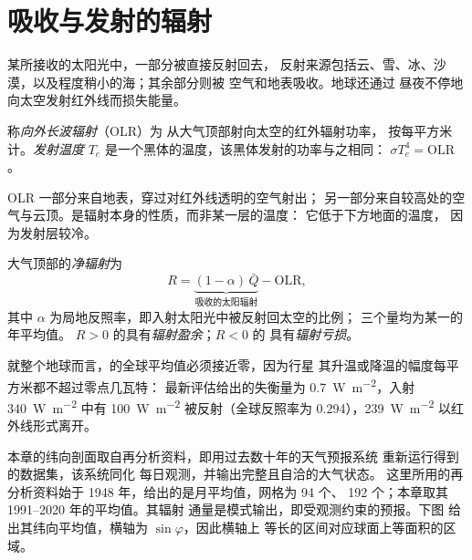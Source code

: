 \section{吸收与发射的辐射}\label{sec:b1:radiation-heat-transport:toa}

某所接收的太阳光中，一部分被直接反射回去，
反射来源包括云、雪、冰、沙漠，以及程度稍小的海；其余部分则被
空气和地表吸收。地球还通过
昼夜不停地向太空发射红外线而损失能量。

\begin{definition}[向外长波辐射]\label{def:b1:radiation-heat-transport:olr}
称\emph{向外长波辐射}（OLR）为
从大气顶部射向太空的红外辐射功率，
按每平方米计。\emph{发射温度}
$T_e$ 是一个黑体的温度，该黑体发射的功率与之相同：
$\sigma T_e^4 = \text{OLR}$。
\end{definition}

OLR 一部分来自地表，穿过对红外线透明的空气射出；
另一部分来自较高处的空气与云顶。是辐射本身的性质，而非某一层的温度：
它低于下方地面的温度，
因为发射层较冷。

\begin{definition}\label{def:b1:radiation-heat-transport:net-radiation}
大气顶部的\emph{净辐射}为
\[
  R = \underbrace{(1 - \alpha)\,\bar Q}_{\text{吸收的太阳辐射}} - \text{OLR},
\]
其中 $\alpha$ 为局地反照率，即入射太阳光中被反射回太空的比例；
三个量均为某一的年平均值。
$R > 0$ 的具有\emph{辐射盈余}；$R < 0$ 的
具有\emph{辐射亏损}。
\end{definition}

就整个地球而言，的全球平均值必须接近零，因为行星
其升温或降温的幅度每平方米都不超过零点几瓦特：
最新评估给出的失衡量为 \qty{0.7}{W.m^{-2}}，入射
\qty{340}{W.m^{-2}} 中有 \qty{100}{W.m^{-2}} 被反射（全球反照率为
\num{0.294}），\qty{239}{W.m^{-2}} 以红外线形式离开。

本章的纬向剖面取自再分析资料，即用过去数十年的天气预报系统
重新运行得到的数据集，该系统同化
每日观测，并输出完整且自洽的大气状态。
这里所用的再分析资料始于 1948 年，给出的是月平均值，网格为 94 个、
192 个；本章取其 1991--2020 年的平均值。其辐射
通量是模式输出，即受观测约束的预报。下图
给出其纬向平均值，横轴为 $\sin\varphi$，因此横轴上
等长的区间对应球面上等面积的区域。

